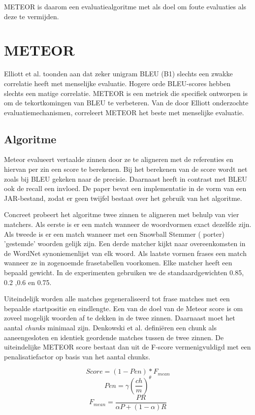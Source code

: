METEOR is daarom een evaluatiealgoritme met als doel om foute evaluaties als deze te vermijden.

\section{METEOR}
Elliott et al.  toonden aan dat zeker unigram BLEU (B1) slechts een zwakke correlatie heeft met menselijke evaluatie. Hogere orde BLEU-scores hebben slechts een matige correlatie. METEOR is een metriek die specifiek ontworpen is om de tekortkomingen van BLEU te verbeteren. Van de door Elliott onderzochte evaluatiemechanismen, correleert METEOR het beste met menselijke evaluatie.

\subsection{Algoritme}
Meteor  evalueert vertaalde zinnen door ze te aligneren met de referenties en hiervan per zin een score te berekenen. Bij het berekenen van de score wordt net zoals bij BLEU gekeken naar de precisie. Daarnaast heeft in contrast met BLEU ook de recall een invloed. De paper bevat een implementatie in de vorm van een JAR-bestand, zodat er geen twijfel bestaat over het gebruik van het algoritme.

Concreet probeert het algoritme twee zinnen te aligneren met behulp van vier matchers. Als eerste is er een match wanneer de woordvormen exact dezelfde zijn. Als tweede is er een match wanneer met een Snowball Stemmer ( porter) 'gestemde' woorden gelijk zijn. Een derde matcher kijkt naar overeenkomsten in de WordNet synoniemenlijst van elk woord.  Als laatste vormen frases een match wanneer ze in zogenoemde frasetabellen voorkomen.
Elke matcher heeft een bepaald gewicht. In de experimenten gebruiken we de standaardgewichten 0.85, 0.2 ,0.6 en 0.75.

Uiteindelijk worden alle matches gegeneraliseerd tot frase matches met een bepaalde startpositie en eindlengte. Een van de doel van de Meteor score is om zoveel mogelijk woorden af te dekken in de twee zinnen. Daarnaast moet het aantal \textit{chunks} minimaal zijn. Denkowski et al. defini\"eren een chunk als aaneengesloten en identiek geordende matches tussen de twee zinnen. De uiteindelijke METEOR score bestaat dan uit de F-score vermenigvuldigd met een penalisatiefactor op basis van het aantal chunks.


\begin{equation}
Score = (1 - Pen)*F_{mean}
\end{equation} 
\begin{equation}
Pen = \gamma (\frac{ch}{m})^\theta
\end{equation}
\begin{equation}
F_{mean} = \frac{PR}{\alpha P + (1- \alpha)R}
\end{equation}

